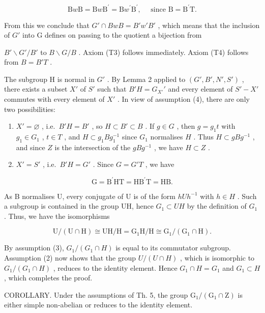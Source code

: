 \[
\mathrm{B} w \mathrm{B} = \mathrm{B} w \mathrm{B} ^ {\prime} = \mathrm{B} w ^ {\prime} \mathrm{B} ^ {\prime}, \quad \text { since } \mathrm{B} = \mathrm{B} ^ {\prime} \mathrm{T}.
\]

From this we conclude that \(G' \cap BwB = B'w'B'\) , which means that the inclusion of \(G'\) into G defines on passing to the quotient a bijection from

\(B'\backslash G'/B'\) to \(B\backslash G/B\) . Axiom (T3) follows immediately. Axiom (T4) follows from \(B = B'T\) .

The subgroup H is normal in \(G'\) . By Lemma 2 applied to \((G', B', N', S')\) , there exists a subset \(X'\) of \(S'\) such that \(B'H = G_{X'}'\) and every element of \(S' - X'\) commutes with every element of \(X'\) . In view of assumption (4), there are only two possibilities:

\begin{enumerate}
\def\labelenumi{\alph{enumi})}
\item
  \(X' = \varnothing\) , i.e.~\(B'H = B'\) , so \(H \subset B' \subset B\) . If \(g \in G\) , then \(g = g_1 t\) with \(g_1 \in G_1\) , \(t \in T\) , and \(H \subset g_1 Bg_1^{-1}\) since \(G_1\) normalises \(H\) . Thus \(H \subset gBg^{-1}\) , and since \(Z\) is the intersection of the \(gBg^{-1}\) , we have \(H \subset Z\) .
\item
  \(X' = S'\) , i.e.~\(B'H = G'\) . Since \(G = G'T\) , we have
\end{enumerate}

\[
\mathrm{G} = \mathrm{B} ^ {\prime} \mathrm{HT} = \mathrm{HB} ^ {\prime} \mathrm{T} = \mathrm{HB}.
\]

As B normalises U, every conjugate of U is of the form \(hUh^{-1}\) with \(h \in H\) . Such a subgroup is contained in the group UH, hence \(G_{1} \subset UH\) by the definition of \(G_{1}\) . Thus, we have the isomorphisms

\[
\mathrm{U} / (\mathrm{U} \cap \mathrm{H}) \cong \mathrm{UH} / \mathrm{H} = \mathrm{G} _ {1} \mathrm{H} / \mathrm{H} \cong \mathrm{G} _ {1} / (\mathrm{G} _ {1} \cap \mathrm{H}).
\]

By assumption (3), \(G_{1}/(G_{1} \cap H)\) is equal to its commutator subgroup. Assumption (2) now shows that the group \(U/(U \cap H)\) , which is isomorphic to \(G_{1}/(G_{1} \cap H)\) , reduces to the identity element. Hence \(G_{1} \cap H = G_{1}\) and \(G_{1} \subset H\) , which completes the proof.

COROLLARY. Under the assumptions of Th. 5, the group \(\mathrm{G}_{1}/(\mathrm{G}_{1} \cap \mathrm{Z})\) is either simple non-abelian or reduces to the identity element.

